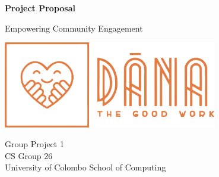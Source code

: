 \begin{titlepage}
	\begin{center}
		\vspace*{1cm}


{\fontsize{30}{30}\selectfont \textbf{Project Proposal}}

    
	

		\vspace{1.5cm}

  {\fontsize{20}{30}\selectfont Empowering Community Engagement}
		

		\vspace{1.5cm}
		\vfill
	\includegraphics[width=0.7\textwidth]{logo.png}
		\vfill

		\vspace{0.8cm}


		Group Project 1\\ CS Group 26\\

	\vspace{0.5\baselineskip}	
	{University of Colombo School of Computing} 
 
    \vspace*{6\baselineskip} 

	\end{center}
\end{titlepage}